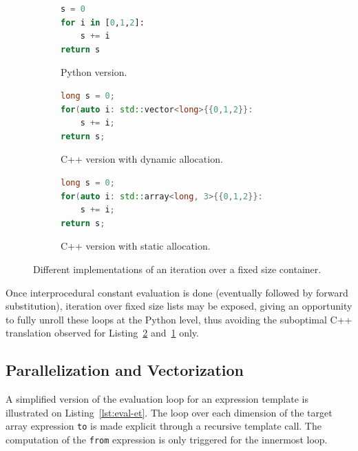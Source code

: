 \documentclass[10pt, preprint]{sigplanconf}
\begin{document}
\begin{figure}

    \begin{subfigure}{.5\textwidth}
    \begin{lstlisting}[language=python]
s = 0
for i in [0,1,2]:
    s += i
return s
\end{lstlisting}
\caption{Python version.}
\end{subfigure}

    \begin{subfigure}{.5\textwidth}
\begin{lstlisting}[language=c++]
long s = 0;
for(auto i: std::vector<long>{{0,1,2}}:
    s += i;
return s;
\end{lstlisting}
\caption{C++ version with dynamic allocation.}
\label{lst:dyna}
\end{subfigure}

    \begin{subfigure}{.5\textwidth}
\begin{lstlisting}[language=c++]
long s = 0;
for(auto i: std::array<long, 3>{{0,1,2}}:
    s += i;
return s;
\end{lstlisting}
\caption{C++ version with static allocation.}
\label{lst:stat}
\end{subfigure}

    \caption{Different implementations of an iteration over a fixed size container.}
    \label{fig:unroll-range}

\end{figure}

Once interprocedural constant evaluation is done (eventually followed by
forward substitution), iteration over fixed size lists may be exposed, giving an
opportunity to fully unroll these loops at the Python level, thus avoiding the
suboptimal C++ translation observed for Listing~\ref{lst:stat}
and~\ref{lst:dyna} only.

\subsection{Parallelization and Vectorization}

A simplified version of the evaluation loop for an expression template is
illustrated on Listing~\ref{lst:eval-et}. The loop over each dimension of the
target array expression \texttt{to} is made explicit through a recursive
template call. The computation of the \texttt{from} expression is only triggered
for the innermost loop.
\end{document}
